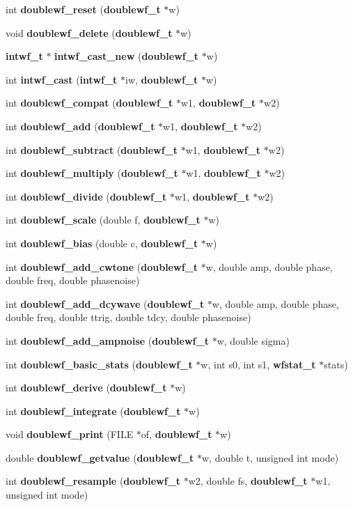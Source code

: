 \begin{CompactItemize}
\item 
int {\bf doublewf\_\-reset} ({\bf doublewf\_\-t} $\ast$w)
\item 
void {\bf doublewf\_\-delete} ({\bf doublewf\_\-t} $\ast$w)
\item 
{\bf intwf\_\-t} $\ast$ {\bf intwf\_\-cast\_\-new} ({\bf doublewf\_\-t} $\ast$w)
\item 
int {\bf intwf\_\-cast} ({\bf intwf\_\-t} $\ast$iw, {\bf doublewf\_\-t} $\ast$w)
\item 
int {\bf doublewf\_\-compat} ({\bf doublewf\_\-t} $\ast$w1, {\bf doublewf\_\-t} $\ast$w2)
\item 
int {\bf doublewf\_\-add} ({\bf doublewf\_\-t} $\ast$w1, {\bf doublewf\_\-t} $\ast$w2)
\item 
int {\bf doublewf\_\-subtract} ({\bf doublewf\_\-t} $\ast$w1, {\bf doublewf\_\-t} $\ast$w2)
\item 
int {\bf doublewf\_\-multiply} ({\bf doublewf\_\-t} $\ast$w1, {\bf doublewf\_\-t} $\ast$w2)
\item 
int {\bf doublewf\_\-divide} ({\bf doublewf\_\-t} $\ast$w1, {\bf doublewf\_\-t} $\ast$w2)
\item 
int {\bf doublewf\_\-scale} (double f, {\bf doublewf\_\-t} $\ast$w)
\item 
int {\bf doublewf\_\-bias} (double c, {\bf doublewf\_\-t} $\ast$w)
\item 
int {\bf doublewf\_\-add\_\-cwtone} ({\bf doublewf\_\-t} $\ast$w, double amp, double phase, double freq, double phasenoise)
\item 
int {\bf doublewf\_\-add\_\-dcywave} ({\bf doublewf\_\-t} $\ast$w, double amp, double phase, double freq, double ttrig, double tdcy, double phasenoise)
\item 
int {\bf doublewf\_\-add\_\-ampnoise} ({\bf doublewf\_\-t} $\ast$w, double sigma)
\item 
int {\bf doublewf\_\-basic\_\-stats} ({\bf doublewf\_\-t} $\ast$w, int s0, int s1, {\bf wfstat\_\-t} $\ast$stats)
\item 
int {\bf doublewf\_\-derive} ({\bf doublewf\_\-t} $\ast$w)
\item 
int {\bf doublewf\_\-integrate} ({\bf doublewf\_\-t} $\ast$w)
\item 
void {\bf doublewf\_\-print} (FILE $\ast$of, {\bf doublewf\_\-t} $\ast$w)
\item 
double {\bf doublewf\_\-getvalue} ({\bf doublewf\_\-t} $\ast$w, double t, unsigned int mode)
\item 
int {\bf doublewf\_\-resample} ({\bf doublewf\_\-t} $\ast$w2, double fs, {\bf doublewf\_\-t} $\ast$w1, unsigned int mode)
\end{CompactItemize}
